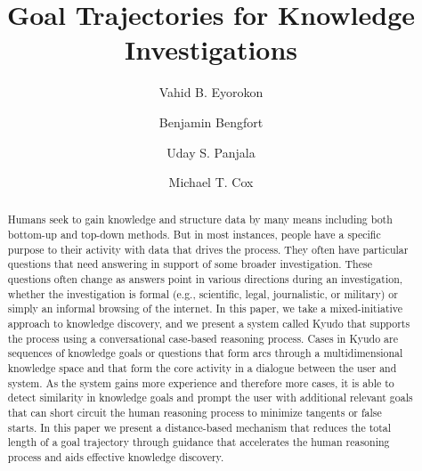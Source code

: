 \documentclass{llncs}
\begin{document}
\title{Goal Trajectories for Knowledge Investigations}
%
%
\author{Vahid B. Eyorokon \and Benjamin Bengfort
\and Uday S. Panjala \and Michael T. Cox}
%
%
%


 
\maketitle              %

\begin{abstract}
Humans seek to gain knowledge and structure data by many means including both bottom-up and top-down methods. But in most instances, people have a specific purpose to their activity with data that drives the process. They often have particular questions that need answering in support of some broader investigation. These questions often change as answers point in various directions during an investigation, whether the investigation is formal (e.g., scientific, legal, journalistic, or military) or simply an informal browsing of the internet. In this paper, we take a mixed-initiative approach to knowledge discovery, and we present a system called Kyudo that supports the process using a conversational case-based reasoning process. Cases in Kyudo are sequences of knowledge goals or questions that form arcs through a multidimensional knowledge space and that form the core activity in a dialogue between the user and system. As the system gains more experience and therefore more cases, it is able to detect similarity in knowledge goals and prompt the user with additional relevant goals that can short circuit the human reasoning process to minimize tangents or false starts. In this paper we present a distance-based mechanism that reduces the total length of a goal trajectory through guidance that accelerates the human reasoning process and aids effective knowledge discovery.
\end{abstract}
%
\end{document}
